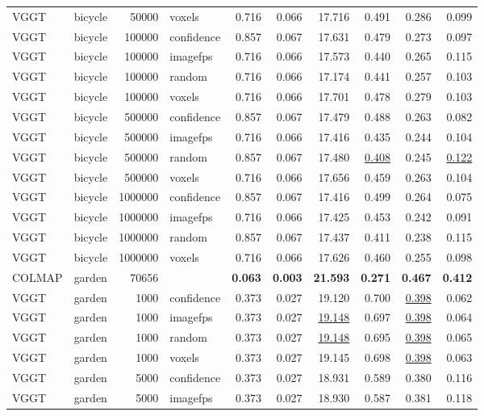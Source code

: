\begin{table}[H]
\begin{tabular}{llrlrrrrrr}
VGGT & bicycle & 50000 & voxels & 0.716 & 0.066 & 17.716 & 0.491 & 0.286 & 0.099 \\
VGGT & bicycle & 100000 & confidence & 0.857 & 0.067 & 17.631 & 0.479 & 0.273 & 0.097 \\
VGGT & bicycle & 100000 & imagefps & 0.716 & 0.066 & 17.573 & 0.440 & 0.265 & 0.115 \\
VGGT & bicycle & 100000 & random & 0.716 & 0.066 & 17.174 & 0.441 & 0.257 & 0.103 \\
VGGT & bicycle & 100000 & voxels & 0.716 & 0.066 & 17.701 & 0.478 & 0.279 & 0.103 \\
VGGT & bicycle & 500000 & confidence & 0.857 & 0.067 & 17.479 & 0.488 & 0.263 & 0.082 \\
VGGT & bicycle & 500000 & imagefps & 0.716 & 0.066 & 17.416 & 0.435 & 0.244 & 0.104 \\
VGGT & bicycle & 500000 & random & 0.857 & 0.067 & 17.480 & \underline{0.408} & 0.245 & \underline{0.122} \\
VGGT & bicycle & 500000 & voxels & 0.716 & 0.066 & 17.656 & 0.459 & 0.263 & 0.104 \\
VGGT & bicycle & 1000000 & confidence & 0.857 & 0.067 & 17.416 & 0.499 & 0.264 & 0.075 \\
VGGT & bicycle & 1000000 & imagefps & 0.716 & 0.066 & 17.425 & 0.453 & 0.242 & 0.091 \\
VGGT & bicycle & 1000000 & random & 0.857 & 0.067 & 17.437 & 0.411 & 0.238 & 0.115 \\
VGGT & bicycle & 1000000 & voxels & 0.716 & 0.066 & 17.626 & 0.460 & 0.255 & 0.098 \\
\midrule
COLMAP & garden & 70656 &  & \textbf{0.063} & \textbf{0.003} & \textbf{21.593} & \textbf{0.271} & \textbf{0.467} & \textbf{0.412} \\
VGGT & garden & 1000 & confidence & 0.373 & 0.027 & 19.120 & 0.700 & \underline{0.398} & 0.062 \\
VGGT & garden & 1000 & imagefps & 0.373 & 0.027 & \underline{19.148} & 0.697 & \underline{0.398} & 0.064 \\
VGGT & garden & 1000 & random & 0.373 & 0.027 & \underline{19.148} & 0.695 & \underline{0.398} & 0.065 \\
VGGT & garden & 1000 & voxels & 0.373 & 0.027 & 19.145 & 0.698 & \underline{0.398} & 0.063 \\
VGGT & garden & 5000 & confidence & 0.373 & 0.027 & 18.931 & 0.589 & 0.380 & 0.116 \\
VGGT & garden & 5000 & imagefps & 0.373 & 0.027 & 18.930 & 0.587 & 0.381 & 0.118 \\

\end{tabular}
\end{table}
